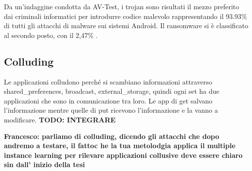 Da un'indaggine condotta da AV-Test, i trojan sono risultati il mezzo preferito dai criminali informatici per introdurre codice malevolo rappresentando il 93.93\%  di tutti gli attacchi di malware sui sistemi Android. Il ransomware si è classificato al secondo posto, con il 2,47\% \cite{trojan}.

\subsection{Colluding}
Le applicazioni colludono perché si scambiano informazioni attraverso shared\_preferences, broadcast, external\_storage, quindi ogni set ha due applicazioni che sono in comunicazione tra loro. Le app di get salvano l'informazione mentre quelle di put ricevono l'informazione e la vanno a modificare.  
\textbf{TODO: INTEGRARE}


\textbf{Francesco: parliamo di colluding, dicendo gli attacchi che dopo andremo a testare, il fattoc he la tua metolodgia applica il multiple instance learning per rilevare applicazioni collusive deve essere chiaro sin dall' inizio della tesi}